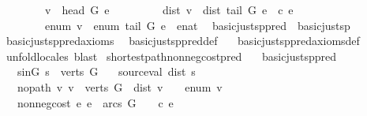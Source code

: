 \begin{isabellebody}
\ \ \ \ \ \ \ \ v\ {\isacharequal}\ head\ G\ e\ {\isasymand}\isanewline
\ \ \ \ \ \ \ \ dist\ v\ {\isacharequal}\ dist\ {\isacharparenleft}tail\ G\ e{\isacharparenright}\ {\isacharplus}\ c\ e\ \ {\isasymand}\isanewline
\ \ \ \ \ \ \ \ enum\ v\ {\isacharequal}\ enum\ {\isacharparenleft}tail\ G\ e{\isacharparenright}\ {\isacharplus}\ {\isacharparenleft}enat\ {}{\isacharparenright}{\isachardoublequoteclose}\isanewline
\isanewline
{}\isamarkupfalse%
\ basic{\isacharunderscore}just{\isacharunderscore}sp{\isacharunderscore}pred\ {\isasymsubseteq}\ basic{\isacharunderscore}just{\isacharunderscore}sp\ \ \isanewline
%
\isadelimproof
%
\endisadelimproof
%
\isatagproof
{}\isamarkupfalse%
\ basic{\isacharunderscore}just{\isacharunderscore}sp{\isacharunderscore}pred{\isacharunderscore}axioms\ \isanewline
{}\isamarkupfalse%
\ basic{\isacharunderscore}just{\isacharunderscore}sp{\isacharunderscore}pred{\isacharunderscore}def\isanewline
\ \ \ basic{\isacharunderscore}just{\isacharunderscore}sp{\isacharunderscore}pred{\isacharunderscore}axioms{\isacharunderscore}def\isanewline
{}\isamarkupfalse%
\ unfold{\isacharunderscore}locales\ {\isacharparenleft}blast{\isacharparenright}%
\endisatagproof
{\isafoldproof}%
%
\isadelimproof
\isanewline
%
\endisadelimproof
\isanewline
{}\isamarkupfalse%
\ shortest{\isacharunderscore}path{\isacharunderscore}non{\isacharunderscore}neg{\isacharunderscore}cost{\isacharunderscore}pred\ {\isacharequal}\isanewline
\ \ basic{\isacharunderscore}just{\isacharunderscore}sp{\isacharunderscore}pred\ {\isacharplus}\isanewline
\ \ \ s{\isacharunderscore}in{\isacharunderscore}G{\isacharcolon}\ {\isachardoublequoteopen}s\ {\isasymin}\ verts\ G{\isachardoublequoteclose}\isanewline
\ \ \ source{\isacharunderscore}val{\isacharcolon}\ {\isachardoublequoteopen}dist\ s\ {\isacharequal}\ {}{\isachardoublequoteclose}\isanewline
\ \ \ no{\isacharunderscore}path{\isacharcolon}\ {\isachardoublequoteopen}{\isasymAnd}v{\isachardot}\ v\ {\isasymin}\ verts\ G\ {\isasymLongrightarrow}\ dist\ v\ {\isacharequal}\ {\isasyminfinity}\ {\isasymlongleftrightarrow}\ enum\ v\ {\isacharequal}\ {\isasyminfinity}{\isachardoublequoteclose}\isanewline
\ \ \ non{\isacharunderscore}neg{\isacharunderscore}cost{\isacharcolon}\ {\isachardoublequoteopen}{\isasymAnd}e{\isachardot}\ e\ {\isasymin}\ arcs\ G\ {\isasymLongrightarrow}\ {}\ {\isasymle}\ c\ e{\isachardoublequoteclose}\isanewline
\isanewline

\end{isabellebody}
